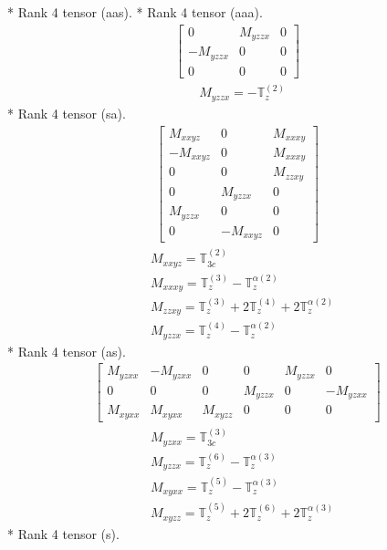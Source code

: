\documentclass[fleqn,8pt,landscape]{jsarticle}
\begin{document}
* Rank 4 tensor (aas).
* Rank 4 tensor (aaa).
\begin{align*}
\begin{bmatrix} 0 & M_{yzzx} & 0 \\ - M_{yzzx} & 0 & 0 \\ 0 & 0 & 0 \end{bmatrix}
\end{align*}
\begin{align*}
& M_{yzzx} = - \mathbb{T}_{z}^{(2)}
\end{align*}
* Rank 4 tensor (sa).
\begin{align*}
\begin{bmatrix} M_{xxyz} & 0 & M_{xxxy} \\ - M_{xxyz} & 0 & M_{xxxy} \\ 0 & 0 & M_{zzxy} \\ 0 & M_{yzzx} & 0 \\ M_{yzzx} & 0 & 0 \\ 0 & - M_{xxyz} & 0 \end{bmatrix}
\end{align*}
\begin{align*}
& M_{xxyz} = \mathbb{T}_{3c}^{(2)} \\
& M_{xxxy} = \mathbb{T}_{z}^{(3)} - \mathbb{T}_{z}^{\alpha(2)} \\
& M_{zzxy} = \mathbb{T}_{z}^{(3)} + 2 \mathbb{T}_{z}^{(4)} + 2 \mathbb{T}_{z}^{\alpha(2)} \\
& M_{yzzx} = \mathbb{T}_{z}^{(4)} - \mathbb{T}_{z}^{\alpha(2)}
\end{align*}
* Rank 4 tensor (as).
\begin{align*}
\begin{bmatrix} M_{yzxx} & - M_{yzxx} & 0 & 0 & M_{yzzx} & 0 \\ 0 & 0 & 0 & M_{yzzx} & 0 & - M_{yzxx} \\ M_{xyxx} & M_{xyxx} & M_{xyzz} & 0 & 0 & 0 \end{bmatrix}
\end{align*}
\begin{align*}
& M_{yzxx} = \mathbb{T}_{3c}^{(3)} \\
& M_{yzzx} = \mathbb{T}_{z}^{(6)} - \mathbb{T}_{z}^{\alpha(3)} \\
& M_{xyxx} = \mathbb{T}_{z}^{(5)} - \mathbb{T}_{z}^{\alpha(3)} \\
& M_{xyzz} = \mathbb{T}_{z}^{(5)} + 2 \mathbb{T}_{z}^{(6)} + 2 \mathbb{T}_{z}^{\alpha(3)}
\end{align*}
* Rank 4 tensor (s).
\end{document}
